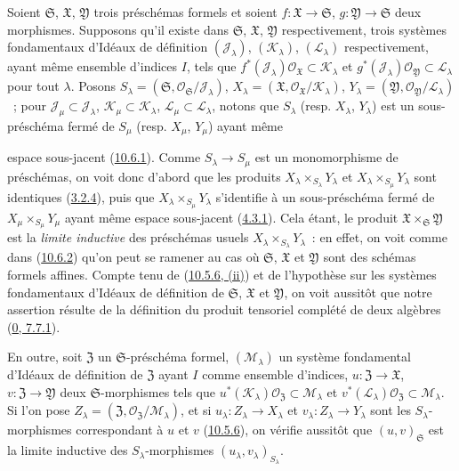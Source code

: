 \begin{env}[10.7.4]
\label{I.10.7.4-fr}
Soient $\mathfrak{S}$, $\mathfrak{X}$, $\mathfrak{Y}$ trois préschémas
formels et soient $f:\mathfrak{X}\to\mathfrak{S}$,
$g:\mathfrak{Y}\to\mathfrak{S}$ deux morphismes. Supposons qu'il existe
dans $\mathfrak{S}$, $\mathfrak{X}$, $\mathfrak{Y}$ respectivement,
trois systèmes fondamentaux d'Idéaux de définition
$(\mathscr{J}_\lambda)$, $(\mathscr{K}_\lambda)$,
$(\mathscr{L}_\lambda)$ respectivement, ayant même ensemble d'indices
$I$, tels que
$f^*(\mathscr{J}_\lambda)\mathscr{O}_{\mathfrak{X}}
\subset\mathscr{K}_\lambda$ et
$g^*(\mathscr{J}_\lambda)\mathscr{O}_{\mathfrak{Y}}
\subset\mathscr{L}_\lambda$ pour tout $\lambda$. Posons
$S_\lambda=(\mathfrak{S},
\mathscr{O}_{\mathfrak{S}}/\mathscr{J}_\lambda)$,
$X_\lambda=(\mathfrak{X},
\mathscr{O}_{\mathfrak{X}}/\mathscr{K}_\lambda)$,
$Y_\lambda=(\mathfrak{Y},
\mathscr{O}_{\mathfrak{Y}}/\mathscr{L}_\lambda)$~; pour
$\mathscr{J}_\mu\subset\mathscr{J}_\lambda$,
$\mathscr{K}_\mu\subset\mathscr{K}_\lambda$,
$\mathscr{L}_\mu\subset\mathscr{L}_\lambda$, notons que
$S_\lambda$ (resp. $X_\lambda$, $Y_\lambda$) est un sous-préschéma fermé
de $S_\mu$ (resp. $X_\mu$, $Y_\mu$) ayant même


espace sous-jacent (\hyperref[I.10.6.1-fr]{10.6.1}). Comme
$S_\lambda\to S_\mu$ est un monomorphisme de préschémas, on voit donc
d'abord que les produits
$X_\lambda\times_{S_\lambda}Y_\lambda$ et
$X_\lambda\times_{S_\mu}Y_\lambda$ sont identiques
(\hyperref[I.3.2.4-fr]{3.2.4}), puis que
$X_\lambda\times_{S_\mu}Y_\lambda$ s'identifie à un sous-préschéma fermé
de $X_\mu\times_{S_\mu}Y_\mu$ ayant même espace sous-jacent
(\hyperref[I.4.3.1-fr]{4.3.1}). Cela étant, le produit
$\mathfrak{X}\times_{\mathfrak{S}}\mathfrak{Y}$ est la
\emph{limite inductive} des préschémas usuels
$X_\lambda\times_{S_\lambda}Y_\lambda$~: en effet, on voit comme dans
(\hyperref[I.10.6.2-fr]{10.6.2}) qu'on peut se ramener au cas où
$\mathfrak{S}$, $\mathfrak{X}$ et $\mathfrak{Y}$ sont des schémas formels
affines. Compte tenu de (\hyperref[I.10.5.6-fr]{10.5.6, (ii)}) et de
l'hypothèse sur les systèmes fondamentaux d'Idéaux de définition de
$\mathfrak{S}$, $\mathfrak{X}$ et $\mathfrak{Y}$, on voit aussitôt que
notre assertion résulte de la définition du produit tensoriel complété de
deux algèbres (\hyperref[0.7.7.1-fr]{0, 7.7.1}).

En outre, soit $\mathfrak{Z}$ un $\mathfrak{S}$-préschéma formel,
$(\mathscr{M}_\lambda)$ un système fondamental d'Idéaux de définition de
$\mathfrak{Z}$ ayant $I$ comme ensemble d'indices,
$u:\mathfrak{Z}\to\mathfrak{X}$,
$v:\mathfrak{Z}\to\mathfrak{Y}$ deux $\mathfrak{S}$-morphismes tels que
$u^*(\mathscr{K}_\lambda)\mathscr{O}_{\mathfrak{Z}}
\subset\mathscr{M}_\lambda$ et
$v^*(\mathscr{L}_\lambda)\mathscr{O}_{\mathfrak{Z}}
\subset\mathscr{M}_\lambda$. Si l'on pose
$Z_\lambda=(\mathfrak{Z},
\mathscr{O}_{\mathfrak{Z}}/\mathscr{M}_\lambda)$, et si
$u_\lambda:Z_\lambda\to X_\lambda$ et
$v_\lambda:Z_\lambda\to Y_\lambda$ sont les $S_\lambda$-morphismes
correspondant à $u$ et $v$ (\hyperref[I.10.5.6-fr]{10.5.6}), on vérifie
aussitôt que $(u,v)_{\mathfrak{S}}$ est la limite inductive des
$S_\lambda$-morphismes $(u_\lambda,v_\lambda)_{S_\lambda}$.


\end{env}
